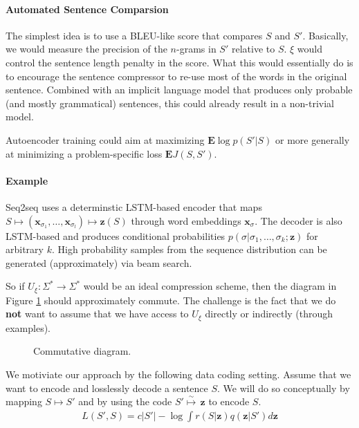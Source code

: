 \documentclass{article}
\newcommand{\E}{{\mathbf E}}
\newcommand{\z}{{\mathbf z}}
\newcommand{\x}{{\mathbf x}}
\newcommand{\smapsto}{{\stackrel \sim \mapsto \,}}
\begin{document}
\paragraph*{Automated Sentence Comparsion}

The simplest idea is to use a BLEU-like score that compares $S$ and $S'$. Basically, we would measure the precision of the $n$-grams in $S'$ relative to $S$.  $\xi$ would control the sentence length penalty in the score. What this would essentially do is to encourage the sentence compressor to re-use most of the words in the original sentence. Combined with an implicit language model that produces only probable (and mostly grammatical) sentences, this could already result in a non-trivial model.  




\newpage


Autoencoder training could aim at maximizing $\E \log p(S'|S)$ or more generally at minimizing a problem-specific loss $\E J(S,S')$.

\paragraph{Example} Seq2seq uses a determinstic LSTM-based encoder that maps $S \mapsto (\x_{\sigma_1},\dots,\x_{\sigma_l}) \mapsto \z(S)$ through word embeddings $\x_\sigma$. The decoder is also LSTM-based and produces conditional probabilities $p(\sigma | \sigma_1,\dots, \sigma_k; \z)$ for arbitrary $k$. High probability samples from the sequence distribution can be generated (approximately) via beam search.



So if $U_\xi: \Sigma^* \to \Sigma^*$  would be an ideal compression scheme, then the diagram in Figure \ref{fig:commute} should approximately commute. The challenge is the fact that we do \textbf{not} want to assume that we have access to $U_\xi$ directly or indirectly (through examples).  \\
\begin{figure}
\begin{center}
\end{center}
\caption{Commutative diagram.}
\label{fig:commute}
\end{figure}

We motiviate our approach by the following data coding setting. Assume that we want to encode and losslessly decode a sentence $S$. We will do so conceptually by mapping $S \mapsto S'$ and by using the code $S' \smapsto  \z$  to encode $S$.
\begin{align}
L(S', S) = {c |S'|} - \log \int r(S|\z) q(\z|S') d\z
\end{align}
\end{document}
